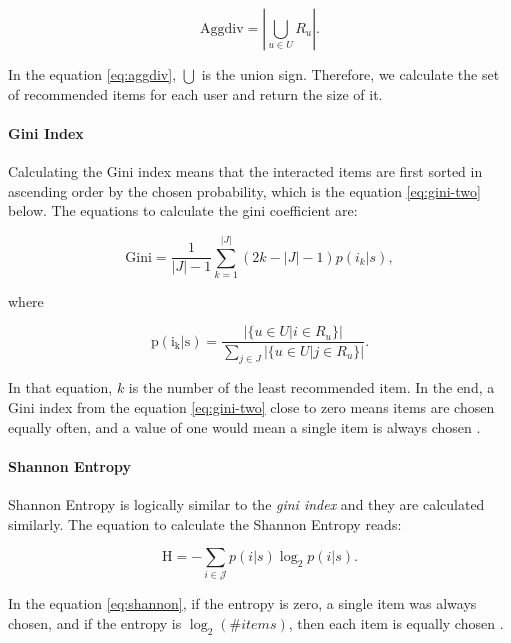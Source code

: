 \begin{equation}
\mathrm {Aggdiv} = \left| \bigcup _ { u \in{ U } } R _ { u } \right| .
\label{eq:aggdiv}
\end{equation}

In the equation \eqref{eq:aggdiv}, $\bigcup$ is the union sign. Therefore, we calculate the set of recommended items for each user and return the size of it.

\paragraph{Gini Index}

Calculating the Gini index means that the interacted items are first sorted in ascending order by the chosen probability, which is the equation \eqref{eq:gini-two} below. The equations to calculate the gini coefficient are:

\begin{equation}
\mathrm {Gini} = \frac { 1 } { |{ J } | - 1 } \sum _ { k = 1 } ^ { | J | } ( 2 k - | J |  - 1 ) p \left( i _ { k } | s \right) ,
\label{eq:gini}
\end{equation}

where

\begin{equation}
\mathrm {p ( i_{k} | s )} = \frac { | \{ u \in { U } | i \in R _ { u } \} | } { \sum _ { j \in J } | \{ u \in { U } | j \in R _ { u } \} | } .
\label{eq:gini-two}
\end{equation}

In that equation, $k$ is the number of the least recommended item. In the end, a Gini index from the equation \eqref{eq:gini-two} close to zero means items are chosen equally often, and a value of one would mean a single item is always chosen \cite{castells2015novelty}.

\paragraph{Shannon Entropy}

Shannon Entropy is logically similar to the \textit{gini index} and they are calculated similarly. The equation to calculate the Shannon Entropy reads:

\begin{equation}
\mathrm { H } = - \sum _ { i \in \mathcal { J } } p ( i | s ) \log _ { 2 } p ( i | s ) .
\label{eq:shannon}
\end{equation}

In the equation \eqref{eq:shannon}, if the entropy is zero, a single item was always chosen, and if the entropy is $\log_{2}(\#items)$, then each item is equally chosen \cite{castells2015novelty}.

